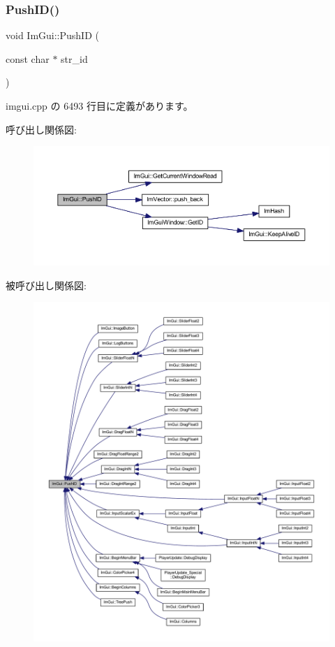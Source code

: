 \subsubsection{\texorpdfstring{Push\+I\+D()}{PushID()}\hspace{0.1cm}{\footnotesize\ttfamily [1/4]}}
{\footnotesize\ttfamily void Im\+Gui\+::\+Push\+ID (\begin{DoxyParamCaption}\item[{const char $\ast$}]{str\+\_\+id }\end{DoxyParamCaption})}



 imgui.\+cpp の 6493 行目に定義があります。

呼び出し関係図\+:\nopagebreak
\begin{figure}[H]
\begin{center}
\leavevmode
\includegraphics[width=350pt]{namespace_im_gui_a27a8533605dc5b8cabf161bf7715bbde_cgraph}
\end{center}
\end{figure}
被呼び出し関係図\+:\nopagebreak
\begin{figure}[H]
\begin{center}
\leavevmode
\includegraphics[width=350pt]{namespace_im_gui_a27a8533605dc5b8cabf161bf7715bbde_icgraph}
\end{center}
\end{figure}
